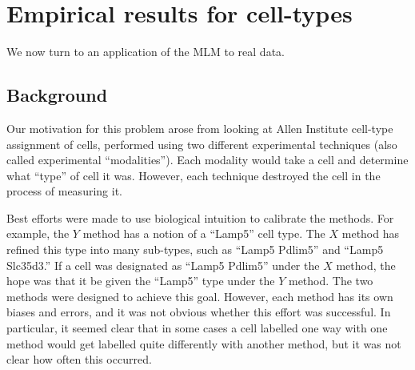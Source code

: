 \section{Empirical results for cell-types}

We now turn to an application of the MLM to real data.


\subsection{Background}

Our motivation for this problem arose from looking at Allen Institute cell-type assignment of cells, performed using two different experimental techniques (also called experimental ``modalities'').  Each modality would take a cell and determine what ``type'' of cell it was.  However, each technique destroyed the cell in the process of measuring it.

Best efforts were made to use biological intuition to calibrate the methods.  For example, the $Y$ method has a notion of a ``Lamp5'' cell type.  The $X$ method has refined this type into many sub-types, such as ``Lamp5 Pdlim5'' and ``Lamp5 Slc35d3.''  If a cell was designated as ``Lamp5 Pdlim5'' under the $X$ method, the hope was that it be given the ``Lamp5'' type under the $Y$ method.  The two methods were designed to achieve this goal.  However, each method has its own biases and errors, and it was not obvious whether this effort was successful.  In particular, it seemed clear that in some cases a cell labelled one way with one method would get labelled quite differently with another method, but it was not clear how often this occurred.  

